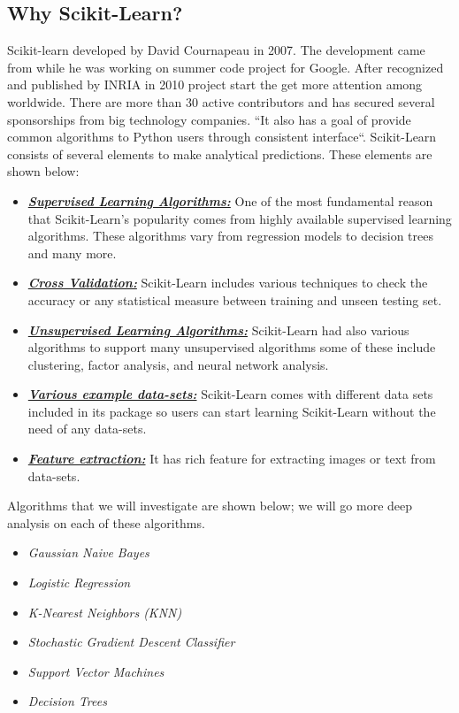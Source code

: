 \documentclass[sigconf]{acmart}
\begin{document}
\subsection{Why Scikit-Learn?}
Scikit-learn developed by David Cournapeau in 2007. The development came from while he was working on summer code project for Google. After recognized and published by INRIA in 2010 project start the get more attention among worldwide. There are more than 30 active contributors and has secured several sponsorships from big technology companies\cite{www-machinelearningmystery}. ``It also has a goal of provide common algorithms to Python users through consistent interface\cite{www-oreily}``. Scikit-Learn consists of several elements to make analytical predictions. These elements are shown below\cite{www-analyticvidhya}:

\begin{itemize}
\item \textbf{\textit{\underline{Supervised Learning Algorithms:}}} One of the most fundamental reason that Scikit-Learn's popularity comes from highly available supervised learning algorithms. These algorithms vary from regression models to decision trees and many more\cite{www-analyticvidhya}. 
\item \textbf{\textit{\underline{Cross Validation:}}} Scikit-Learn includes various techniqu\-es to check the accuracy or any statistical measure between training and unseen testing set\cite{www-analyticvidhya}. 
\item \textbf{\textit{\underline{Unsupervised Learning Algorithms:}}} Scikit-Learn had al\-so various algorithms to support many unsupervised algorithms some of these include clustering, factor analysis, and neural network analysis\cite{www-analyticvidhya}. 
\item \textbf{\textit{\underline{Various example data-sets:}}} Scikit-Learn comes with different data sets included in its package so users can start learning Scikit-Learn without the need of any data-sets\cite{www-analyticvidhya}. 
\item \textbf{\textit{\underline{Feature extraction:}}} It has rich feature for extracting images or text from data-sets\cite{www-analyticvidhya}.
\end{itemize}

\par Algorithms that we will investigate are shown below; we will go more deep analysis on each of these algorithms. 

\begin{itemize}
    \item \textit{Gaussian Naive Bayes}
    \item \textit{Logistic Regression}
    \item \textit{K-Nearest Neighbors (KNN)}
    \item \textit{Stochastic Gradient Descent Classifier}
    \item \textit{Support Vector Machines}
    \item \textit{Decision Trees} 
\end{itemize}
\end{document}

